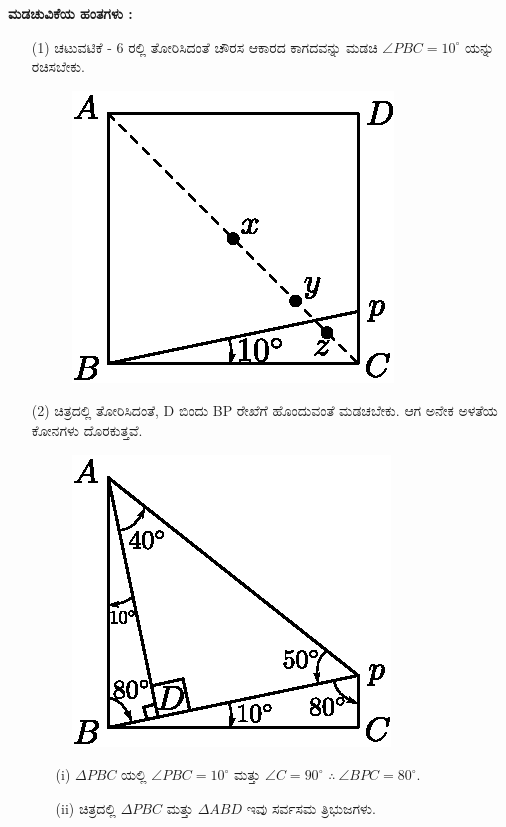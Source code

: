\medskip
\noindent
\textbf{ಮಡಚುವಿಕೆಯ ಹಂತಗಳು :}
\begin{enumerate}
\item[(1)] ಚಟುವಟಿಕೆ - 6 ರಲ್ಲಿ ತೋರಿಸಿದಂತೆ ಚೌರಸ ಆಕಾರದ ಕಾಗದವನ್ನು ಮಡಚಿ $\angle PBC = 10^\circ$ ಯನ್ನು ರಚಿಸಬೇಕು.
\begin{figure}[H]
\centering
\includegraphics[scale=.98]{src/figure/chap1/fig1-13a.eps}
\end{figure}

\item[(2)] ಚಿತ್ರದಲ್ಲಿ ತೋರಿಸಿದಂತೆ, D ಬಿಂದು BP ರೇಖೆಗೆ ಹೊಂದುವಂತೆ ಮಡಚಬೇಕು. ಆಗ ಅನೇಕ ಅಳತೆಯ ಕೋನಗಳು ದೊರಕುತ್ತವೆ. 
\begin{figure}[H]
\centering
\includegraphics[scale=.98]{src/figure/chap1/fig1-13b.eps}
\end{figure}
\begin{itemize}
\item[(i)] $\Delta PBC$ ಯಲ್ಲಿ $\angle PBC =  10^\circ$ ಮತ್ತು $\angle C =90^\circ$  $\therefore ~ \angle BPC = 80^\circ$.

\item[(ii)] ಚಿತ್ರದಲ್ಲಿ $\Delta PBC$ ಮತ್ತು $\Delta ABD$ ಇವು ಸರ್ವಸಮ ತ್ರಿಭುಜಗಳು.


\end{itemize}
\end{enumerate}
